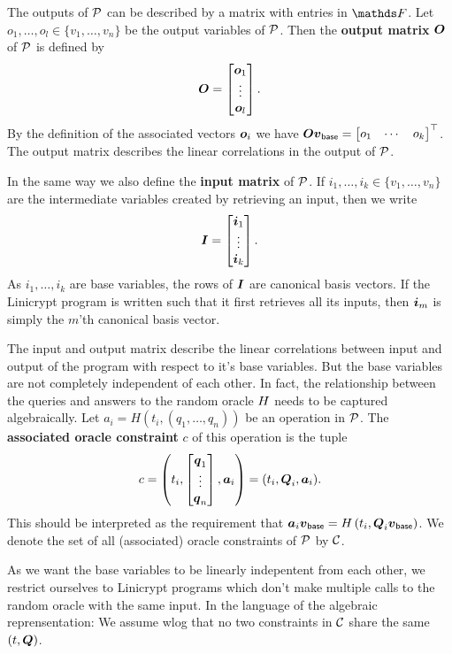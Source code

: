 The outputs of $\P$ can be described by a matrix with entries in $\F$.
Let $o_1, \dots, o_l \in \{v_1, \dots, v_n \}$ be the output variables of $\P$.
Then the \textbf{output matrix} $\O$ of $\P$ is defined by
\[
  \O =
  \begin{bmatrix}
  \v o_1\\
  \vdots \\
  \v o_l
  \end{bmatrix}
  .
\]
By the definition of the associated vectors $\v o_i$ we have
$
\O \vbase = 
  \begin{bmatrix} o_1 & \cdots & o_k \end{bmatrix}^\top
$.
The output matrix describes the linear correlations in the output of $\P$.

In the same way we also define the \textbf{input matrix} of $\P$.
If $i_1, \dots, i_k \in \{v_1, \dots, v_n\}$ are the intermediate variables created by retrieving an input,
then we write
\[
  \Inp = \begin{bmatrix}
  \v i_1 \\
  \vdots \\
  \v i_k
  \end{bmatrix}.
\]
As $i_1, \dots, i_k$ are base variables,
the rows of $\Inp$ are canonical basis vectors.
If the Linicrypt program is written such that it first retrieves all its inputs,
then $\v i_m$ is simply the $m$'th canonical basis vector. 

The input and output matrix describe the linear correlations between input and output of the program with respect to it's base variables.
But the base variables are not completely independent of each other.
In fact, the relationship between the queries and answers to the random oracle $\H$ needs to be captured algebraically.
Let $a_i = H(t_i, (q_1, \dots, q_n))$ be an operation in $\P$.
The \textbf{associated oracle constraint} $c$ of this operation is the tuple
\[
  c = \left( t_i, \begin{bmatrix}
  \v q_1 \\
  \vdots \\
  \v q_n
  \end{bmatrix},
  \va_i \right)
	=
	(t_i, \Q_i, \va_i)
	.
\]
This should be interpreted as the requirement that
$
\va_i \vbase = \H \left( t_i, \Q_i \vbase \right)
$.
We denote the set of all (associated) oracle constraints of $\P$ by $\C$.

As we want the base variables to be linearly indepentent from each other,
we restrict ourselves to Linicrypt programs which don't make multiple calls to the random oracle with the same input.
In the language of the algebraic reprensentation:
We assume wlog that no two constraints in $\C$ share the same $(t, \Q)$.

